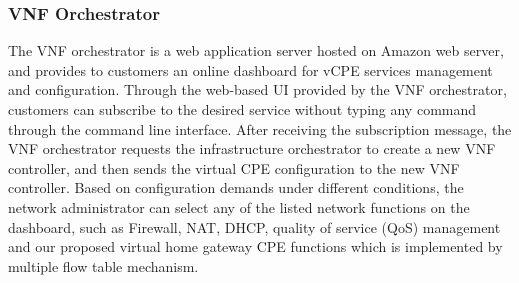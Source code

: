 \subsubsection{VNF Orchestrator}
The VNF orchestrator is a web application server hosted on Amazon web server, and provides to customers an online dashboard for vCPE services management and configuration. Through the web-based UI provided by the VNF orchestrator, customers can subscribe to the desired service without typing any command through the command line interface. After receiving the subscription message, the VNF orchestrator requests the infrastructure orchestrator to create a new VNF controller, and then sends the virtual CPE configuration to the new VNF controller. Based on configuration demands under different conditions, the network administrator can select any of the listed network functions on the dashboard, such as Firewall, NAT, DHCP, quality of service (QoS) management and our proposed virtual home gateway CPE functions which is implemented by multiple flow table mechanism.
